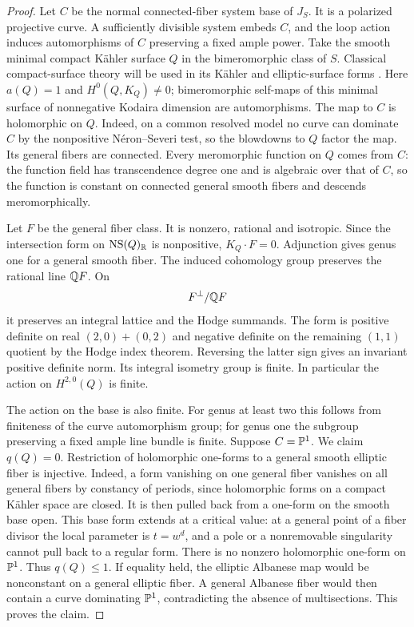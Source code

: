 \begin{proof}
Let $C$ be the normal connected-fiber system base of $J_S$.
It is a polarized projective curve.  A sufficiently divisible
system embeds $C$, and the loop action induces automorphisms of
$C$ preserving a fixed ample power.  Take the smooth minimal
compact K\"ahler surface $Q$ in the bimeromorphic class of $S$.
Classical compact-surface theory will be used in its K\"ahler
and elliptic-surface forms \cite{BHPV}.  Here $a(Q)=1$ and
$H^0(Q,K_Q)\ne0$; bimeromorphic self-maps of this minimal
surface of nonnegative Kodaira dimension are automorphisms.
The map to $C$ is holomorphic on $Q$.  Indeed, on a common
resolved model no curve can dominate $C$ by the nonpositive
N\'eron--Severi test, so the blowdowns to $Q$ factor the map.
Its general fibers are connected.  Every meromorphic function
on $Q$ comes from $C$: the function field has transcendence
degree one and is algebraic over that of $C$, so the function
is constant on connected general smooth fibers and descends
meromorphically.

Let $F$ be the general fiber class.  It is nonzero, rational
and isotropic.  Since the intersection form on $\operatorname{NS}(Q)_{\mathbb{R}}$
is nonpositive, $K_Q\cdot F=0$.  Adjunction gives genus one
for a general smooth fiber.  The induced cohomology group
preserves the rational line $\mathbb{Q} F$.  On
\begin{equation}
 \label{floor:isotropic-quotient}
 F^\perp/\mathbb{Q} F
\end{equation}
it preserves an integral lattice and the Hodge summands.  The
form is positive definite on real $(2,0)+(0,2)$ and negative
definite on the remaining $(1,1)$ quotient by the Hodge index
theorem.  Reversing the latter sign gives an invariant positive
definite norm.  Its integral isometry group is finite.  In
particular the action on $H^{2,0}(Q)$ is finite.

The action on the base is also finite.  For genus at least two
this follows from finiteness of the curve automorphism group;
for genus one the subgroup preserving a fixed ample line
bundle is finite.  Suppose $C=\mathbb{P}^1$.  We claim $q(Q)=0$.
Restriction of holomorphic one-forms to a general smooth
elliptic fiber is injective.  Indeed, a form vanishing on one
general fiber vanishes on all general fibers by constancy of
periods, since holomorphic forms on a compact K\"ahler space
are closed.  It is then pulled back from a one-form on the
smooth base open.  This base form extends at a critical value:
at a general point of a fiber divisor the local parameter is
$t=w^d$, and a pole or a nonremovable singularity cannot
pull back to a regular form.  There is no nonzero holomorphic
one-form on $\mathbb{P}^1$.  Thus $q(Q)\le1$.  If equality held,
the elliptic Albanese map would be nonconstant on a general
elliptic fiber.  A general Albanese fiber would then contain
a curve dominating $\mathbb{P}^1$, contradicting the absence of
multisections.  This proves the claim.


\end{proof}
